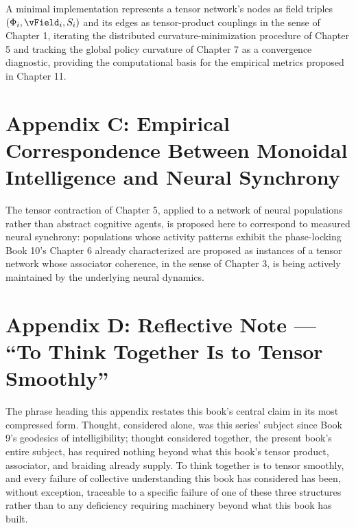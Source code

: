 A minimal implementation represents a tensor network's nodes as field triples $(\PhiField_i, \vField_i, \SEntropy_i)$ and its edges as tensor-product couplings in the sense of Chapter 1, iterating the distributed curvature-minimization procedure of Chapter 5 and tracking the global policy curvature of Chapter 7 as a convergence diagnostic, providing the computational basis for the empirical metrics proposed in Chapter 11.

\chapter*{Appendix C: Empirical Correspondence Between Monoidal Intelligence and Neural Synchrony}

The tensor contraction of Chapter 5, applied to a network of neural populations rather than abstract cognitive agents, is proposed here to correspond to measured neural synchrony: populations whose activity patterns exhibit the phase-locking Book 10's Chapter 6 already characterized are proposed as instances of a tensor network whose associator coherence, in the sense of Chapter 3, is being actively maintained by the underlying neural dynamics.

\chapter*{Appendix D: Reflective Note --- ``To Think Together Is to Tensor Smoothly''}

The phrase heading this appendix restates this book's central claim in its most compressed form. Thought, considered alone, was this series' subject since Book 9's geodesics of intelligibility; thought considered together, the present book's entire subject, has required nothing beyond what this book's tensor product, associator, and braiding already supply. To think together is to tensor smoothly, and every failure of collective understanding this book has considered has been, without exception, traceable to a specific failure of one of these three structures rather than to any deficiency requiring machinery beyond what this book has built.

